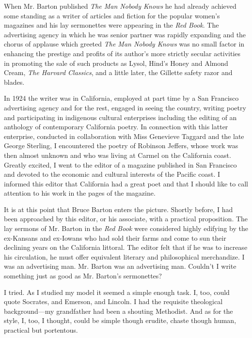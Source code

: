 \documentclass[nohyper,openany,nobib]{tufte-book}
\begin{document}
When Mr. Barton published \emph{The Man Nobody Knows} he had already
achieved some standing as a writer of articles and fiction for the
popular women's magazines and his lay sermonettes were appearing in the
\emph{Red Book}. The advertising agency in which he was senior partner
was rapidly expanding and the chorus of applause which greeted \emph{The
Man Nobody Knows} was no small factor in enhancing the prestige and
profits of its author's more strictly secular activities in promoting
the sale of such products as Lysol, Hind's Honey and Almond Cream,
\emph{The Harvard Classics}, and a little later, the Gillette safety
razor and blades.

In 1924 the writer was in California, employed at part time by a San
Francisco advertising agency and for the rest, engaged in seeing the
country, writing poetry and participating in indigenous cultural
enterprises including the editing of an anthology of contemporary
California poetry. In connection with this latter enterprise, conducted
in collaboration with Miss Genevieve Taggard and the late George
Sterling, I encountered the poetry of Robinson Jeffers, whose work was
then almost unknown and who was living at Carmel on the California
coast. Greatly excited, I went to the editor of a magazine published in
San Francisco and devoted to the economic and cultural interests of the
Pacific coast. I informed this editor that California had a great poet
and that I should like to call attention to his work in the pages of the
magazine.

\enlargethispage{\baselineskip}

It is at this point that Bruce Barton enters the picture. Shortly
before, I had been approached by this editor, or his associate, with a
practical proposition. The lay sermons of Mr. Barton in the \emph{Red
Book} were considered highly edifying by the ex-Kansans and ex-Iowans
who had sold their farms and come to sun their declining years on the
California littoral. The editor felt that if he was to increase his
circulation, he must offer equivalent literary and philosophical
merchandize. I was an advertising man. Mr. Barton was an advertising
man. Couldn't I write something just as good as Mr. Barton's
sermonettes?

I tried. As I studied my model it seemed a simple enough task. I, too,
could quote Socrates, and Emerson, and Lincoln. I had the requisite
theological background---my grandfather had been a shouting Methodist.
And as for the style, I, too, I thought, could be simple though erudite,
chaste though human, practical but portentous.
\end{document}
